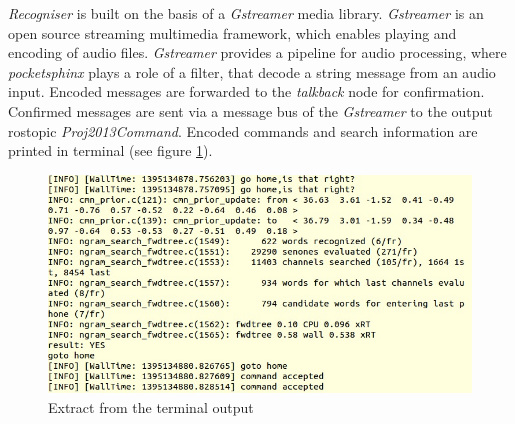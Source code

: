 \documentclass[11pt,a4paper]{report}
\begin{document}
\textit {Recogniser} is built on the basis of a \textit {Gstreamer}
media library. \textit {Gstreamer} is an open source streaming multimedia
framework, which enables playing and encoding of audio files. \textit
{Gstreamer} provides a pipeline for audio processing, where \textit {pocketsphinx}  plays a role of
a filter, that decode  a string message from an audio input. Encoded messages
are forwarded to the \textit {talkback} node for confirmation. Confirmed messages are sent via a message bus of the \textit {Gstreamer} to the
output rostopic \textit {Proj2013Command}. Encoded commands and search
information are printed in terminal (see figure \ref{fig:terminal}). 
\begin{figure}[h] 
\begin {center}
     \includegraphics[height=8.0 cm]{terminal}
     \caption {Extract from the terminal output}
     \label {fig:terminal}
     \end {center}
     \end {figure}
\end{document}
